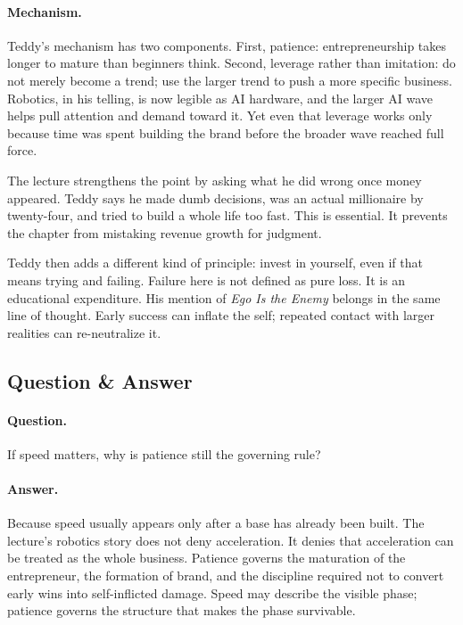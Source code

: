 \paragraph{Mechanism.}
Teddy's mechanism has two components. First, patience: entrepreneurship takes longer to mature than beginners think. Second, leverage rather than imitation: do not merely become a trend; use the larger trend to push a more specific business. Robotics, in his telling, is now legible as AI hardware, and the larger AI wave helps pull attention and demand toward it. Yet even that leverage works only because time was spent building the brand before the broader wave reached full force.

The lecture strengthens the point by asking what he did wrong once money appeared. Teddy says he made dumb decisions, was an actual millionaire by twenty-four, and tried to build a whole life too fast. This is essential. It prevents the chapter from mistaking revenue growth for judgment.

Teddy then adds a different kind of principle: invest in yourself, even if that means trying and failing. Failure here is not defined as pure loss. It is an educational expenditure. His mention of \emph{Ego Is the Enemy} belongs in the same line of thought. Early success can inflate the self; repeated contact with larger realities can re-neutralize it.

\subsection{Question \& Answer}

\paragraph{Question.}
If speed matters, why is patience still the governing rule?

\paragraph{Answer.}
Because speed usually appears only after a base has already been built. The lecture's robotics story does not deny acceleration. It denies that acceleration can be treated as the whole business. Patience governs the maturation of the entrepreneur, the formation of brand, and the discipline required not to convert early wins into self-inflicted damage. Speed may describe the visible phase; patience governs the structure that makes the phase survivable.

